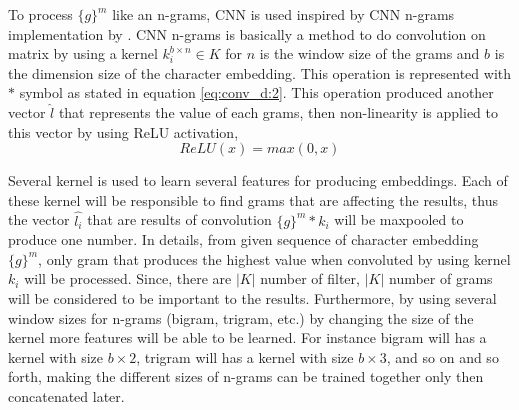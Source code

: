         To process $\{g\}^m$ like an n-grams, CNN is used inspired
        by CNN n-grams implementation by \cite{convolutional2014kim}.
        CNN n-grams is basically a method to do convolution on matrix
        by using a kernel $k_i^{b \times n} \in K$ for $n$ is the
        window size of the grams and $b$ is the dimension size of the
        character embedding. This operation is represented with $*$
        symbol as stated in equation \ref{eq:conv_d:2}. This operation
        produced another vector $\hat{l}$ that represents the value of
        each grams, then non-linearity is applied to this vector by
        using ReLU activation,
        \begin{equation}
            \label{eq:relu}
            ReLU(x) = max(0,x)
        \end{equation}

        Several kernel is used to learn several features for producing
        embeddings. Each of these kernel will be responsible to find
        grams that are affecting the results, thus the vector
        $\hat{l_i}$ that are results of convolution $\{g\}^m * k_i$
        will be maxpooled to produce one number. In details, from
        given sequence of character embedding $\{g\}^m$, only gram
        that produces the highest value when convoluted by using
        kernel $k_i$ will be processed. Since, there are $\vert K
        \vert$ number of filter, $\vert K \vert$ number of grams will
        be considered to be important to the results. Furthermore, by
        using several window sizes for n-grams (bigram, trigram, etc.)
        by changing the size of the kernel more features will be able
        to be learned. For instance bigram will has a kernel with size
        $b \times 2$, trigram will has a kernel with size $b \times
        3$, and so on and so forth, making the different sizes of
        n-grams can be trained together only then concatenated later.


